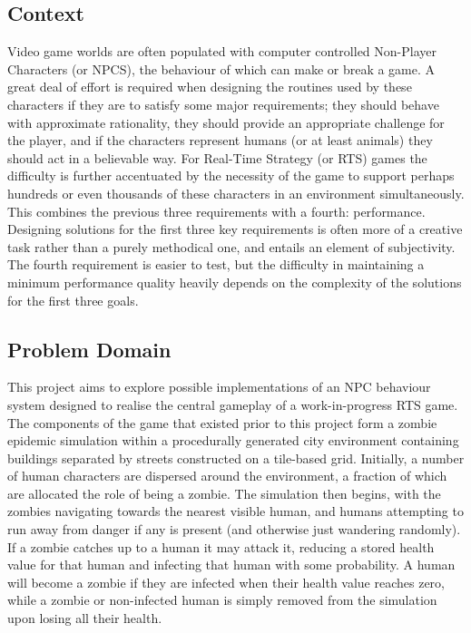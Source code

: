 \documentclass[12pt,a4paper]{article}
\begin{document}
\subsection{Context}\noindent
Video game worlds are often populated with computer controlled Non-Player Characters (or NPCS), the behaviour of which can make or break a game. A great deal of effort is required when designing the routines used by these characters if they are to satisfy some major requirements; they should behave with approximate rationality, they should provide an appropriate challenge for the player, and if the characters represent humans (or at least animals) they should act in a believable way. For Real-Time Strategy (or RTS) games the difficulty is further accentuated by the necessity of the game to support perhaps hundreds or even thousands of these characters in an environment simultaneously. This combines the previous three requirements with a fourth: performance. Designing solutions for the first three key requirements is often more of a creative task rather than a purely methodical one, and entails an element of subjectivity. The fourth requirement is easier to test, but the difficulty in maintaining a minimum performance quality heavily depends on the complexity of the solutions for the first three goals.

\subsection{Problem Domain}\noindent
This project aims to explore possible implementations of an NPC behaviour system designed to realise the central gameplay of a work-in-progress RTS game. The components of the game that existed prior to this project form a zombie epidemic simulation within a procedurally generated city environment containing buildings separated by streets constructed on a tile-based grid. Initially, a number of human characters are dispersed around the environment, a fraction of which are allocated the role of being a zombie. The simulation then begins, with the zombies navigating towards the nearest visible human, and humans attempting to run away from danger if any is present (and otherwise just wandering randomly). If a zombie catches up to a human it may attack it, reducing a stored health value for that human and infecting that human with some probability. A human will become a zombie if they are infected when their health value reaches zero, while a zombie or non-infected human is simply removed from the simulation upon losing all their health.
\end{document}
